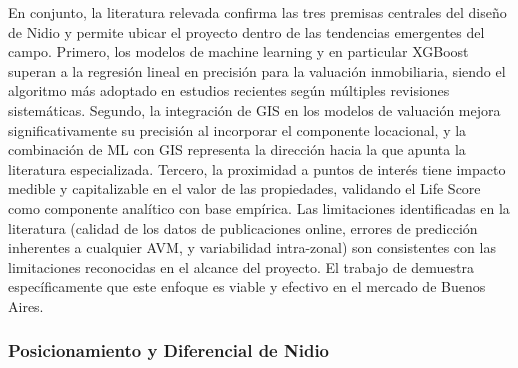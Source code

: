 En conjunto, la literatura relevada confirma las tres premisas centrales del diseño de Nidio y permite ubicar el proyecto dentro de las tendencias emergentes del campo. Primero, los modelos de machine learning y en particular XGBoost superan a la regresión lineal en precisión para la valuación inmobiliaria, siendo el algoritmo más adoptado en estudios recientes según múltiples revisiones sistemáticas. Segundo, la integración de GIS en los modelos de valuación mejora significativamente su precisión al incorporar el componente locacional, y la combinación de ML con GIS representa la dirección hacia la que apunta la literatura especializada. Tercero, la proximidad a puntos de interés tiene impacto medible y capitalizable en el valor de las propiedades, validando el Life Score como componente analítico con base empírica. Las limitaciones identificadas en la literatura (calidad de los datos de publicaciones online, errores de predicción inherentes a cualquier AVM, y variabilidad intra-zonal) son consistentes con las limitaciones reconocidas en el alcance del proyecto. El trabajo de \textcite{GutierrezEtAl2025} demuestra específicamente que este enfoque es viable y efectivo en el mercado de Buenos Aires.

\subsubsection{Posicionamiento y Diferencial de Nidio}

